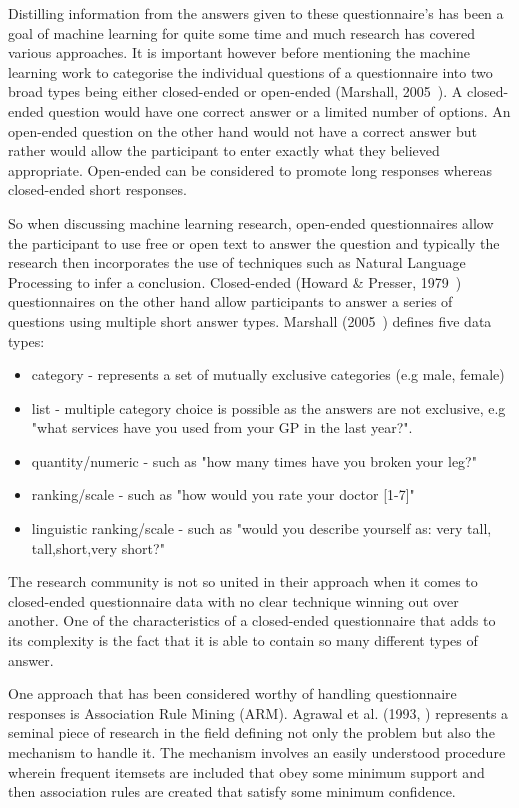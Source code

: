 Distilling information from the answers given to these questionnaire's has been a goal of machine learning for quite some time and much research has covered various approaches. It is important however before mentioning the machine learning work to categorise the individual questions of a questionnaire into two broad types being either closed-ended or open-ended (Marshall, 2005~\cite{marshall2005purpose}). A closed-ended question would have one correct answer or a limited number of options. An open-ended question on the other hand would not have a correct answer but rather would allow the participant to enter exactly what they believed appropriate. Open-ended can be considered to promote long responses whereas closed-ended short responses.

So when discussing machine learning research, open-ended questionnaires allow the participant to use free or open text to answer the question and typically the research then incorporates the use of techniques such as Natural Language Processing to infer a conclusion. Closed-ended (Howard \& Presser, 1979~\cite{10.2307/2094521}) questionnaires on the other hand allow participants to answer a series of questions using multiple short answer types. Marshall (2005~\cite{marshall2005purpose}) defines five data types:

\begin{itemize}
    \item category - represents a set of mutually exclusive categories (e.g male, female)
    \item list - multiple category choice is possible as the answers are not exclusive, e.g "what services have you used from your GP in the last year?".
    \item quantity/numeric - such as "how many times have you broken your leg?"
    \item ranking/scale - such as "how would you rate your doctor [1-7]"
    \item linguistic ranking/scale - such as "would you describe yourself as: very tall, tall,short,very short?"
\end{itemize}

The research community is not so united in their approach when it comes to closed-ended questionnaire data with no clear technique winning out over another. One of the characteristics of a closed-ended questionnaire that adds to its complexity is the fact that it is able to contain so many different types of answer.

One approach that has been considered worthy of handling questionnaire responses is Association Rule Mining (ARM). Agrawal et al. (1993,  \cite{agrawal1993mining}) represents a seminal piece of research in the field defining not only the problem but also the mechanism to handle it. The mechanism involves an easily understood procedure wherein frequent itemsets are included that obey some minimum support and then association rules are created that satisfy some minimum confidence.

